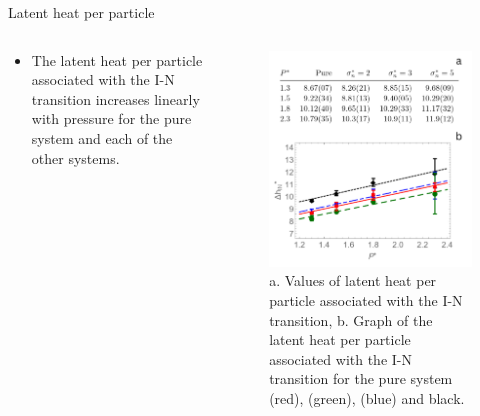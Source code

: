 \documentclass{beamer}
\begin{document}
\begin{frame}{Latent heat per particle}
    \begin{columns}
        \begin{column}{0.5\textwidth}
        \begin{itemize}
            \item The latent heat per particle associated with the I-N transition increases linearly with pressure for the pure system and each of the other systems.
        \end{itemize}
        \end{column}
        
        \begin{column}{0.5\textwidth}
        \begin{figure}
            \centering
            \includegraphics[scale = 0.20]{Figures/L_Heat.png}
            \caption{{\scriptsize a. Values of latent heat per particle associated with the I-N transition, b. Graph of the latent heat per particle associated with the I-N transition for the pure system (red), (green), (blue) and black.}}
            \label{fig:enter-label}
        \end{figure}
        \end{column}
    \end{columns}
\end{frame}
\end{document}
